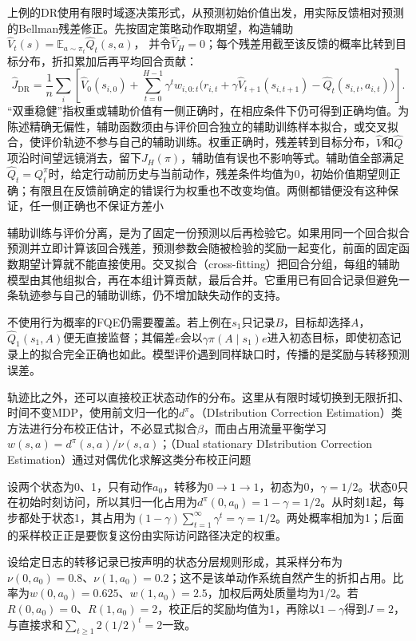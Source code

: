 上例的DR使用有限时域逐决策形式，从预测初始价值出发，用实际反馈相对预测的Bellman残差修正。先按固定策略动作取期望，构造辅助
$\widehat V_t(s)=\mathbb E_{a\sim\pi_t}\widehat Q_t(s,a)$，
并令$\widehat V_H=0$；每个残差用截至该反馈的概率比转到目标分布，折扣累加后再平均回合贡献：
\begin{equation}
  \label{eq:rl-information-dr}
  \widehat J_{\mathrm{DR}}
  =\frac1n\sum_i\left[
    \widehat V_0(s_{i,0})
    +\sum_{t=0}^{H-1}\gamma^t w_{i,0:t}
       \bigl(r_{i,t}+\gamma\widehat V_{t+1}(s_{i,t+1})
                         -\widehat Q_t(s_{i,t},a_{i,t})\bigr)
    \right].
\end{equation}
“双重稳健”指权重或辅助价值有一侧正确时，在相应条件下仍可得到正确均值。为陈述精确无偏性，辅助函数须由与评价回合独立的辅助训练样本拟合，或交叉拟合，使评价轨迹不参与自己的辅助训练。权重正确时，残差转到目标分布，$\widehat V$和$\widehat Q$项沿时间望远镜消去，留下$J_H(\pi)$，辅助值有误也不影响等式。辅助值全部满足$\widehat Q_t=Q_t^\pi$时，给定行动前历史与当前动作，残差条件均值为0，初始价值期望则正确；有限且在反馈前确定的错误行为权重也不改变均值。两侧都错便没有这种保证，任一侧正确也不保证方差小

辅助训练与评价分离，是为了固定一份预测以后再检验它。如果用同一个回合拟合预测并立即计算该回合残差，预测参数会随被检验的奖励一起变化，前面的固定函数期望计算就不能直接使用。交叉拟合（cross-fitting）把回合分组，每组的辅助模型由其他组拟合，再在本组计算贡献，最后合并。它重用已有回合记录但避免一条轨迹参与自己的辅助训练，仍不增加缺失动作的支持。

不使用行为概率的FQE仍需要覆盖。若上例在$s_1$只记录$B$，目标却选择$A$，$\widehat Q_1(s_1,A)$便无直接监督；其偏差$e$会以$\gamma\pi(A\mid s_1)e$进入初态目标，即使初态记录上的拟合完全正确也如此。模型评价遇到同样缺口时，传播的是奖励与转移预测误差。

轨迹比之外，还可以直接校正状态动作的分布。这里从有限时域切换到无限折扣、时间不变MDP，使用前文归一化的$d^\pi$。（DIstribution Correction Estimation）类方法进行分布校正估计，不必显式拟合$\beta$，而由占用流量平衡学习
$w(s,a)=d^\pi(s,a)/\nu(s,a)$；（Dual stationary DIstribution Correction Estimation）通过对偶优化求解这类分布校正问题

\begin{example}[将分层采样校正为目标占用]
  \label{ex:rl-information-dice-flow}
  设两个状态为0、1，只有动作$a_0$，转移为$0\to1\to1$，初态为0，$\gamma=1/2$。状态0只在初始时刻访问，所以其归一化占用为$d^\pi(0,a_0)=1-\gamma=1/2$。从时刻1起，每步都处于状态1，其占用为$(1-\gamma)\sum_{t=1}^{\infty}\gamma^t=\gamma=1/2$。两处概率相加为1；后面的采样校正正是要恢复这份由实际访问路径决定的权重。

  设给定日志的转移记录已按声明的状态分层规则形成，其采样分布为$\nu(0,a_0)=0.8$、$\nu(1,a_0)=0.2$；这不是该单动作系统自然产生的折扣占用。比率为$w(0,a_0)=0.625$、$w(1,a_0)=2.5$，加权后两处质量均为$1/2$。若$R(0,a_0)=0$、$R(1,a_0)=2$，校正后的奖励均值为1，再除以$1-\gamma$得到$J=2$，与直接求和$\sum_{t\geq1}2(1/2)^t=2$一致。
\end{example}

